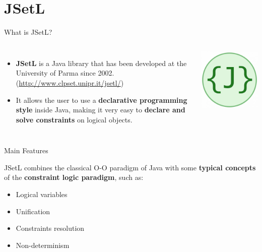 \documentclass{beamer}
\begin{document}
\section{JSetL}
\begin{frame}{What is JSetL?}
	\begin{columns}
        	\begin{itemize}
        	\setlength\itemsep{2em}
			\item \textbf{JSetL} is a Java library that has been developed at the University of Parma since 2002.\\
			(\url{http://www.clpset.unipr.it/jsetl/})\\
			\item It allows the user to use a \textbf{declarative programming style} inside Java, making it very easy to \textbf{declare and solve constraints} on logical objects.
			\end{itemize}

			\includegraphics[scale=0.3]{img/JSetL.png}
	\end{columns}
\end{frame}

\begin{frame}{Main Features}

JSetL combines the classical O-O paradigm of Java with some \textbf{typical concepts} of the \textbf{constraint logic paradigm}, such as:
\vspace{5 mm}
\begin{itemize}
\setlength\itemsep{2em}
        	\item Logical variables
        	\item Unification
        	\item Constraints resolution
        	\item Non-determinism
	\end{itemize}      
\end{frame}
\end{document}
